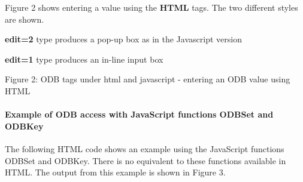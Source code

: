 Figure 2 shows entering a value using the {\bfseries HTML} tags. The two different styles are shown.
\begin{DoxyItemize}
\item {\bfseries edit=2} type produces a pop-\/up box as in the Javascript version
\item {\bfseries edit=1} type produces an in-\/line input box
\end{DoxyItemize}

\par
\par
\par
 \begin{center} Figure 2: ODB tags under html and javascript -\/ entering an ODB value using HTML \par
\par
\par
  \par
\par
\par
 \end{center} \hypertarget{RC_mhttpd_custom_ODB_access_examples_RC_mhttpd_js_example2}{}\paragraph{Example of ODB access with JavaScript functions ODBSet and ODBKey}\label{RC_mhttpd_custom_ODB_access_examples_RC_mhttpd_js_example2}
The following HTML code shows an example using the JavaScript functions ODBSet and ODBKey. There is no equivalent to these functions available in HTML. The output from this example is shown in Figure 3.


